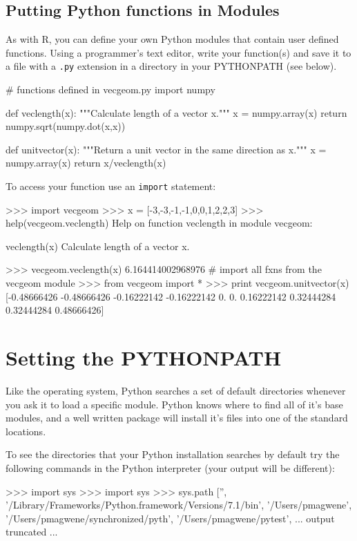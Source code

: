 \subsection{Putting Python functions in Modules}

As with R, you can define your own Python modules that contain user
defined functions. Using a programmer's text editor, write your
function(s) and save it to a file with a \lstinline!.py! extension in a
directory in your PYTHONPATH (see below).

\begin{python}
# functions defined in vecgeom.py
import numpy

def veclength(x):
    """Calculate length of a vector x.""" 
    x = numpy.array(x)
    return numpy.sqrt(numpy.dot(x,x))


def unitvector(x):
    """Return a unit vector in the same direction as x."""
    x = numpy.array(x)
    return x/veclength(x)
\end{python}
%
To access your function use an \lstinline!import! statement:
%
\begin{python}
>>> import vecgeom
>>> x = [-3,-3,-1,-1,0,0,1,2,2,3]
>>> help(vecgeom.veclength)
Help on function veclength in module vecgeom:

veclength(x)
    Calculate length of a vector x.

>>> vecgeom.veclength(x)
6.164414002968976
# import all fxns from the vecgeom module
>>> from vecgeom import * 
>>> print vecgeom.unitvector(x)
[-0.48666426 -0.48666426 -0.16222142 -0.16222142  0.          0.   
     0.16222142  0.32444284  0.32444284  0.48666426]
\end{python}

\section{Setting the PYTHONPATH}

Like the operating system, Python searches a set of default directories whenever you ask it to load a specific module.  Python knows where to find all of it's base modules, and a well written package will install it's files into one of the standard locations.

To see the directories that your Python installation searches by default try the following commands in the Python interpreter (your output will be different):
%
\begin{python}
>>> import sys
>>> import sys
>>> sys.path
['', '/Library/Frameworks/Python.framework/Versions/7.1/bin', '/Users/pmagwene', 
'/Users/pmagwene/synchronized/pyth', '/Users/pmagwene/pytest', 
... output truncated ...
\end{python}

